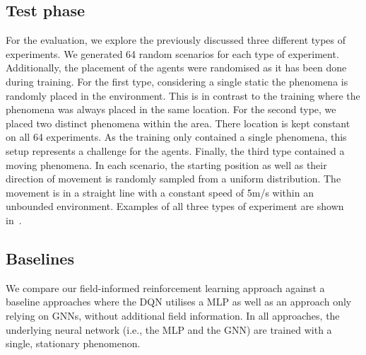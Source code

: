 \documentclass[conference]{IEEEtran}
\begin{document}
\subsection{Test phase}
For the evaluation, 
 we explore the previously discussed three different types of experiments.
%
We generated 64 random scenarios for each type of experiment. Additionally, the placement of the agents were randomised as it has been done during training.
For the first type, considering a single static the phenomena is randomly placed in the environment. This is in contrast to the training where the phenomena was always placed in the same location.  
For the second type, we placed two distinct phenomena within the area. There location is kept constant on all 64 experiments. As the training only contained a single phenomena, this setup represents a challenge for the agents.
Finally, the third type contained a moving phenomena. In each scenario, the starting position as well as their direction of movement is randomly sampled from a uniform distribution. The movement is in a straight line with a constant speed of 5m/s within an unbounded environment. 
%
Examples of all three types of experiment are shown in~. %


\subsection{Baselines}
We compare our field-informed reinforcement learning approach against a baseline approaches where the \ac{DQN} utilises a \ac{MLP} as well as an approach only relying on \acp{GNN}, without additional field information. 
%
In all approaches, the underlying neural network (i.e., the \ac{MLP} and the \ac{GNN}) are trained %
with a single, stationary phenomenon.
%
\end{document}
